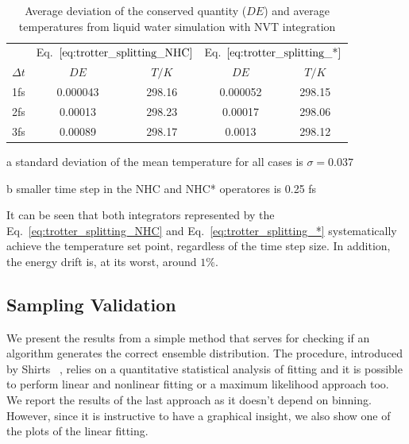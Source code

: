 \documentclass[aip,jcp,reprint,amsmath,amssymb]{revtex4-1}
\begin{document}
\begin{table}[h]
\setlength{\tabcolsep}{7pt}
\begin{threeparttable}
\caption{Average deviation of the conserved quantity ($DE$) and average temperatures from liquid water simulation with NVT integration } 
\label{table:denvt}

\centering %
\begin{tabular}{|c c c c c |}  
\hline
& \multicolumn{2}{c}{Eq.~$\ref{eq:trotter_splitting_NHC}$} &\multicolumn{2}{c|}{Eq.~$\ref{eq:trotter_splitting_*}$} \\
\cline{2-5}
$\Delta t$ &$D E$ &$T/K$ &$D E$ &$T/K$\\
\hline %
 1fs  & 0.000043 & 298.16  & 0.000052  & 298.15 \\

 2fs  & 0.00013 & 298.23  & 0.00017 & 298.06  \\

 3fs  & 0.00089 & 298.17  & 0.0013 & 298.12  \\

 \hline
\end{tabular}
\begin{tablenotes}
\item[a] standard deviation of the mean temperature for all cases is $\sigma = 0.037$
\item[b] smaller time step in the NHC and NHC* operatores is 0.25 fs 
\end{tablenotes}
\end{threeparttable}
\end{table}

It can be seen that both integrators represented by the Eq.~\ref{eq:trotter_splitting_NHC} and Eq.~\ref{eq:trotter_splitting_*} systematically achieve the temperature set point, regardless of the time step size. In addition, the energy drift is, at its worst, around $1 \%$.

\subsection{Sampling Validation}

We present the results from a simple method that serves for checking if an algorithm generates the correct ensemble distribution. The procedure, introduced by Shirts ~\cite{Shirts2013}, relies on a quantitative statistical analysis of fitting and it is possible to perform linear and nonlinear fitting or a maximum likelihood approach too. We report the results of the last approach as it doesn't depend on binning. However, since it is instructive to have a graphical insight, we also show one of the plots of the linear fitting.
\end{document}
